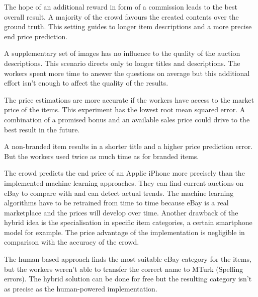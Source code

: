 The hope of an additional reward in form of a commission leads to the best overall result. A majority of the crowd favours the created contents over the ground truth. This setting guides to longer item descriptions and a more precise end price prediction.

A supplementary set of images has no influence to the quality of the auction descriptions. This scenario directs only to longer titles and descriptions. The workers spent more time to answer the questions on average but this additional effort isn't enough to affect the quality of the results.

The price estimations are more accurate if the workers have access to the market price of the items. This experiment has the lowest root mean squared error. A combination of a promised bonus and an available sales price could drive to the best result in the future.

A non-branded item results in a shorter title and a higher price prediction error. But the workers used twice as much time as for branded items.

The crowd predicts the end price of an Applie iPhone more precisely than the implemented machine learning approaches. They can find current auctions on eBay to compare with and can detect actual trends. The machine learning algorithms have to be retrained from time to time because eBay is a real marketplace and the prices will develop over time. Another drawback of the hybrid idea is the specialisation in specific item categories, a certain smartphone model for example. The price advantage of the implementation is negligible in comparison with the accuracy of the crowd.

The human-based approach finds the most suitable eBay category for the items, but the workers weren't able to transfer the correct name to MTurk (Spelling errors). The hybrid solution can be done for free but the resulting category isn't as precise as the human-powered implementation.
